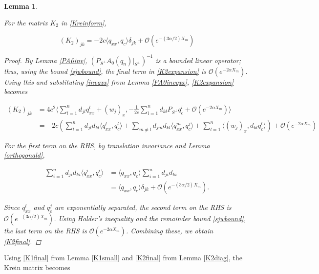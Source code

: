 \documentclass[12pt]{article}
\newtheorem{lemma}{Lemma}
\begin{document}
\begin{lemma}\label{K2diag}

For the matrix $K_2$ in \eqref{Kreinform}, 

\begin{equation}\label{K2final}
(K_2)_{jk} 
= -2 c \langle q_{xx}, q_c \rangle \delta_{jk} + \mathcal{O}(e^{-(3 \alpha/2) X_m})
\end{equation}

\begin{proof}
By Lemma \ref{PA0inv}, $(P_{S^\perp} A_0(q_n)|_{S^\perp})^{-1}$ is a bounded linear operator; thus, using the bound \eqref{sjwbound}, the final term in \eqref{K2expansion} is $\mathcal{O}(e^{-2 \alpha X_m})$. Using this and substituting \eqref{invqxx} from Lemma \ref{PA0invqxx}, \eqref{K2expansion} becomes

\begin{align*}
(K_2)_{jk} 
&= 4 c^2 \langle \sum_{l = 1}^{n} d_{jl} q^l_{xx} + (w_j)_x, 
-\frac{1}{2c}\sum_{l = 1}^{n} d_{kl} P_{S^\perp} q^l_c + \mathcal{O}(e^{-2 \alpha X_m}) \rangle \\
&= -2 c \left( \sum_{l = 1}^{n} d_{jl} d_{kl} \langle q^l_{xx}, q^l_c \rangle
+ \sum_{m\neq l} d_{jm} d_{kl} \langle q^m_{xx}, q^j_c \rangle
+ \sum_{l=1}^n \langle (w_j)_x, d_{kl} q^l_c \rangle \right) + \mathcal{O}(e^{-2 \alpha X_m})
\end{align*}

For the first term on the RHS, by translation invariance and Lemma \ref{orthogonald},

\begin{align*}
\sum_{i = 1}^{n} d_{ji} d_{ki} \langle q^i_{xx}, q^i_c \rangle
&= \langle q_{xx}, q_c \rangle \sum_{i = 1}^{n} d_{ji} d_{ki} \\
&= \langle q_{xx}, q_c \rangle \delta_{jk} + \mathcal{O}(e^{-(3 \alpha/2) X_m}).
\end{align*}

Since $q^l_{xx}$ and $q^j_c$ are exponentially separated, the second term on the RHS is $\mathcal{O}(e^{-(3 \alpha/2) X_m})$. Using Holder's inequality and the remainder bound \eqref{sjwbound}, the last term on the RHS is $\mathcal{O}(e^{-2 \alpha X_m})$. Combining these, we obtain \eqref{K2final}.

\end{proof}
\end{lemma}

Using \eqref{K1final} from Lemma \ref{K1small} and \eqref{K2final} from Lemma \eqref{K2diag}, the Krein matrix becomes
\end{document}
